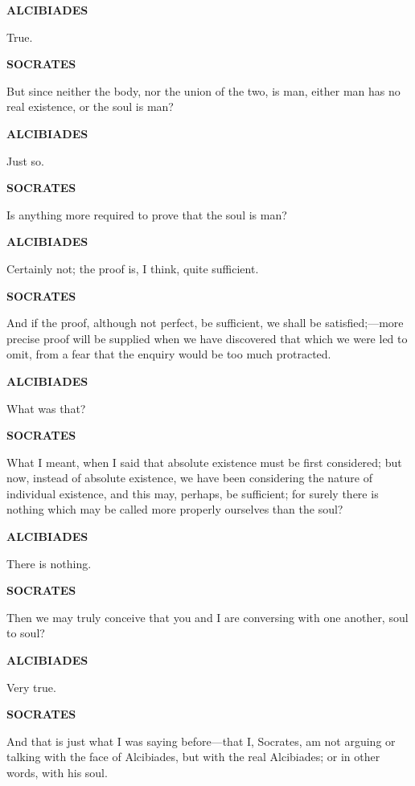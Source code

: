 \documentclass[11pt,letter]{article}
\begin{document}
\par \textbf{ALCIBIADES}
\par   True.

\par \textbf{SOCRATES}
\par   But since neither the body, nor the union of the two, is man, either man has no real existence, or the soul is man?

\par \textbf{ALCIBIADES}
\par   Just so.

\par \textbf{SOCRATES}
\par   Is anything more required to prove that the soul is man?

\par \textbf{ALCIBIADES}
\par   Certainly not; the proof is, I think, quite sufficient.

\par \textbf{SOCRATES}
\par   And if the proof, although not perfect, be sufficient, we shall be satisfied;—more precise proof will be supplied when we have discovered that which we were led to omit, from a fear that the enquiry would be too much protracted.

\par \textbf{ALCIBIADES}
\par   What was that?

\par \textbf{SOCRATES}
\par   What I meant, when I said that absolute existence must be first considered; but now, instead of absolute existence, we have been considering the nature of individual existence, and this may, perhaps, be sufficient; for surely there is nothing which may be called more properly ourselves than the soul?

\par \textbf{ALCIBIADES}
\par   There is nothing.

\par \textbf{SOCRATES}
\par   Then we may truly conceive that you and I are conversing with one another, soul to soul?

\par \textbf{ALCIBIADES}
\par   Very true.

\par \textbf{SOCRATES}
\par   And that is just what I was saying before—that I, Socrates, am not arguing or talking with the face of Alcibiades, but with the real Alcibiades; or in other words, with his soul.
\end{document}
